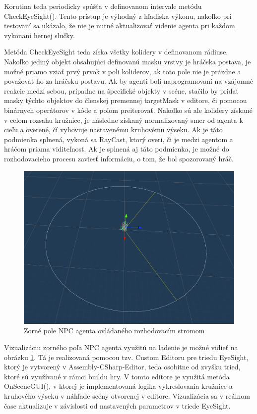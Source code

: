 \documentclass[slovak, master]{diploma}
\begin{document}
Korutina teda periodicky spúšťa v definovanom intervale metódu CheckEyeSight(). Tento prístup je výhodný z hľadiska výkonu, nakoľko pri testovaní sa ukázalo, že nie je nutné aktualizovať videnie agenta pri každom vykonaní hernej slučky. 

Metóda CheckEyeSight teda získa všetky kolidery v definovanom rádiuse. Nakoľko jediný objekt obsahujúci definovanú masku vrstvy je hráčska postava, je možné priamo vziať prvý prvok v poli koliderov, ak toto pole nie je prázdne a považovať ho za hráčsku postavu. Ak by agenti boli naprogramovaní na vzájomné reakcie medzi sebou, prípadne na špecifické objekty v scéne, stačilo by pridať masky týchto objektov do členskej premennej targetMask v editore, či pomocou binárnych operátorov v kóde a poľom preiterovať. Nakoľko sú ale kolidery získané v celom rozsahu kružnice, je následne získaný normalizovaný smer od agenta k cieľu a overené, čí vyhovuje nastavenému kruhovému výseku. Ak je táto podmienka splnená, vykoná sa RayCast, ktorý overí, či je medzi agentom a hráčom priama viditeľnosť. Ak je splnená aj táto podmienka, je možné do rozhodovacieho procesu zaviesť informáciu, o tom, že bol spozorovaný hráč.  

\begin{figure}[!htbp]
    \centering
    \includegraphics[width=.65\textwidth]{Figures/fov.png}
    \caption{Zorné pole NPC agenta ovládaného rozhodovacím stromom}
    \label{pic:FovDecision}
\end{figure}

Vizualizáciu zorného poľa NPC agenta využitú na ladenie je možné vidieť na obrázku \ref{pic:FovDecision}. Tá je realizovaná pomocou tzv. Custom Editoru pre triedu EyeSight, ktorý je vytvorený v Assembly-CSharp-Editor, teda osobitne od zvyšku tried, ktoré sú využívané v rámci buildu hry. V tomto editore je využitá metóda OnSceneGUI(), v ktorej je implementovaná logika vykreslovania kružnice a kruhového výseku v náhľade scény otvorenej v editore. Vizualizácia sa v reálnom čase aktualizuje v závislosti od nastavených parametrov v triede EyeSight.
\end{document}
